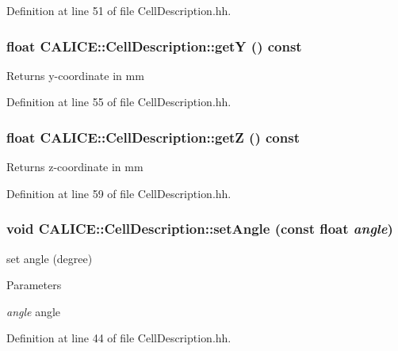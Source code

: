 Definition at line 51 of file CellDescription.hh.
\subsubsection[{getY}]{\setlength{\rightskip}{0pt plus 5cm}float CALICE::CellDescription::getY () const\hspace{0.3cm}{\ttfamily  [inline]}}\label{classCALICE_1_1CellDescription_a1d991be14922f386721db45f4f1fc867}
\begin{DoxyReturn}{Returns}
y-\/coordinate in mm 
\end{DoxyReturn}


Definition at line 55 of file CellDescription.hh.
\subsubsection[{getZ}]{\setlength{\rightskip}{0pt plus 5cm}float CALICE::CellDescription::getZ () const\hspace{0.3cm}{\ttfamily  [inline]}}\label{classCALICE_1_1CellDescription_aa3584dc1a9065f24afe9383413be6e6a}
\begin{DoxyReturn}{Returns}
z-\/coordinate in mm 
\end{DoxyReturn}


Definition at line 59 of file CellDescription.hh.
\subsubsection[{setAngle}]{\setlength{\rightskip}{0pt plus 5cm}void CALICE::CellDescription::setAngle (const float {\em angle})\hspace{0.3cm}{\ttfamily  [inline]}}\label{classCALICE_1_1CellDescription_ac554c485d42741252eab360fb8bef09e}


set angle (degree) 
\begin{DoxyParams}{Parameters}
\item[{\em angle}]angle \end{DoxyParams}


Definition at line 44 of file CellDescription.hh.

